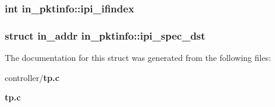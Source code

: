 \subsubsection[{ipi\_\-ifindex}]{\setlength{\rightskip}{0pt plus 5cm}int {\bf in\_\-pktinfo::ipi\_\-ifindex}}\label{structin__pktinfo_ac1aa22828a11552e54f53bb3aed1168d}
\subsubsection[{ipi\_\-spec\_\-dst}]{\setlength{\rightskip}{0pt plus 5cm}struct {\bf in\_\-addr} {\bf in\_\-pktinfo::ipi\_\-spec\_\-dst}}\label{structin__pktinfo_a3ed6e057196d3d34d043631453df83c1}


The documentation for this struct was generated from the following files:\begin{DoxyCompactItemize}
\item 
controller/{\bf tp.c}\item 
{\bf tp.c}\end{DoxyCompactItemize}
